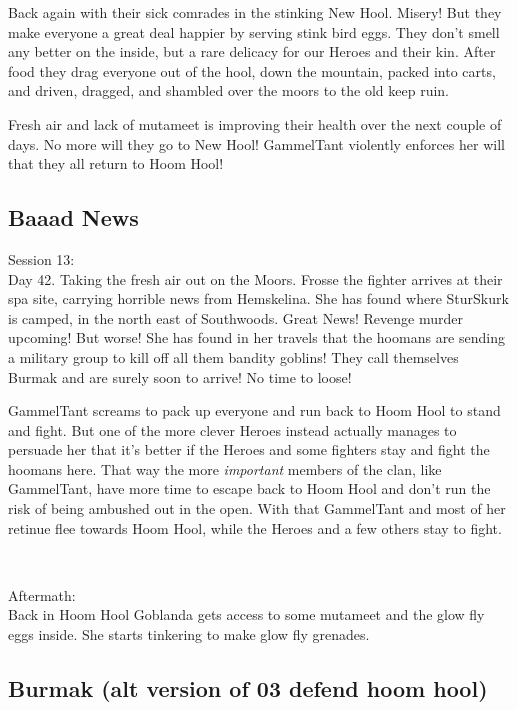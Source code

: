 Back again with their sick comrades in the stinking New Hool. Misery! But they make everyone a great deal happier by serving stink bird eggs. They don't smell any better on the inside, but a rare delicacy for our Heroes and their kin. After food they drag everyone out of the hool, down the mountain, packed into carts, and driven, dragged, and shambled over the moors to the old keep ruin.

Fresh air and lack of mutameet is improving their health over the next couple of days. No more will they go to New Hool! GammelTant violently enforces her will that they all return to Hoom Hool!


\subsection*{Baaad News}

\forceindent Session 13:\\                                              %
Day 42. Taking the fresh air out on the Moors. Frosse the fighter arrives at their spa site, carrying horrible news from Hemskelina. She has found where SturSkurk is camped, in the north east of Southwoods. Great News! Revenge murder upcoming!
But worse! She has found in her travels that the hoomans are sending a military group to kill off all them bandity goblins! They call themselves Burmak and are surely soon to arrive! No time to loose!

GammelTant screams to pack up everyone and run back to Hoom Hool to stand and fight. But one of the more clever Heroes instead actually manages to persuade her that it's better if the Heroes and some fighters stay and fight the hoomans here. That way the more \emph{important} members of the clan, like GammelTant, have more time to escape back to Hoom Hool and don't run the risk of being ambushed out in the open.
With that GammelTant and most of her retinue flee towards Hoom Hool, while the Heroes and a few others stay to fight.

\

Aftermath:\\
Back in Hoom Hool Goblanda gets access to some mutameet and the glow fly eggs inside. She starts tinkering to make glow fly grenades.


\subsection*{Burmak (alt version of 03 defend hoom hool)}

